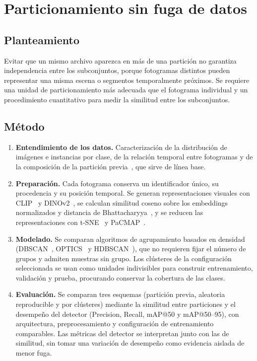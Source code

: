 \section{Particionamiento sin fuga de datos}
\label{sec:particion}

\subsection{Planteamiento}
Evitar que un mismo archivo aparezca en más de una partición no garantiza independencia entre los subconjuntos, porque fotogramas distintos pueden representar una misma escena o segmentos temporalmente próximos. Se requiere una unidad de particionamiento más adecuada que el fotograma individual y un procedimiento cuantitativo para medir la similitud entre los subconjuntos.

\subsection{Método}
\begin{enumerate}
    \item \textbf{Entendimiento de los datos.} Caracterización de la distribución de imágenes e instancias por clase, de la relación temporal entre fotogramas y de la composición de la partición previa~\cite{acosta2025eyes}, que sirve de línea base.
    \item \textbf{Preparación.} Cada fotograma conserva un identificador único, su procedencia y su posición temporal. Se generan representaciones visuales con CLIP~\cite{radford2021clip} y DINOv2~\cite{oquab2024dinov2}, se calculan similitud coseno sobre los embeddings normalizados y distancia de Bhattacharyya~\cite{kailath1967bhattacharyya}, y se reducen las representaciones con t-SNE~\cite{vandermaaten2008tsne} y PaCMAP~\cite{wang2021pacmap}.
    \item \textbf{Modelado.} Se comparan algoritmos de agrupamiento basados en densidad (DBSCAN~\cite{ester1996dbscan}, OPTICS~\cite{ankerst1999optics} y HDBSCAN~\cite{mcinnes2017hdbscan}), que no requieren fijar el número de grupos y admiten muestras sin grupo. Los clústeres de la configuración seleccionada se usan como unidades indivisibles para construir entrenamiento, validación y prueba, procurando conservar la cobertura de las clases.
    \item \textbf{Evaluación.} Se comparan tres esquemas (partición previa, aleatoria reproducible y por clústeres) mediante la similitud entre particiones y el desempeño del detector (Precision, Recall, mAP@50 y mAP@50--95), con arquitectura, preprocesamiento y configuración de entrenamiento comparables. Las métricas del detector se interpretan junto con las de similitud, sin tomar una variación de desempeño como evidencia aislada de menor fuga.
\end{enumerate}

